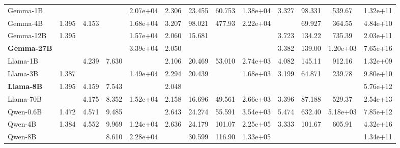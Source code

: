 \begin{tabular}{l|cccc|cccc|cccc}
Gemma-1B & \cellcolor{green2}{1.370} & \cellcolor{green3}{4.043} & \cellcolor{green5}{7.009} & 2.07e+04 & 2.306 & 23.455 & 60.753 & 1.38e+04 & 3.327 & 98.331 & 539.67 & 1.32e+11 \\
Gemma-4B & 1.395 & 4.153 & \cellcolor{green3}{7.298} & 1.68e+04 & 3.207 & 98.021 & 477.93 & 2.22e+04 & \cellcolor{green1}{2.988} & 69.927 & 364.55 & 4.84e+10 \\
Gemma-12B & 1.395 & \cellcolor{green1}{4.084} & \cellcolor{green4}{7.210} & 1.57e+04 & 2.060 & 15.681 & \cellcolor{green2}{37.171} & \cellcolor{green3}{545.83} & 3.723 & 134.22 & 735.39 & 2.03e+11 \\
\textbf{Gemma-27B} & \cellcolor{green4}{1.327} & \cellcolor{green5}{3.803} & \cellcolor{green1}{7.458} & 3.39e+04 & 2.050 & \cellcolor{green4}{13.034} & \cellcolor{green4}{32.353} & \cellcolor{green2}{603.20} & 3.382 & 139.00 & 1.20e+03 & 7.65e+16 \\
\midrule

Llama-1B & \cellcolor{green1}{1.374} & 4.239 & 7.630 & \cellcolor{green2}{6.38e+03} & 2.106 & 20.469 & 53.010 & 2.74e+03 & 4.082 & 145.11 & 912.16 & 1.32e+09 \\
Llama-3B & 1.387 & \cellcolor{green2}{4.061} & \cellcolor{green2}{7.344} & 1.49e+04 & 2.294 & 20.439 & \cellcolor{green1}{44.895} & 1.68e+03 & 3.199 & 64.871 & 239.78 & 9.80e+10 \\
\textbf{Llama-8B} & 1.395 & 4.159 & 7.543 & \cellcolor{green1}{9.03e+03} & 2.048 & \cellcolor{green5}{8.565} & \cellcolor{green5}{17.331} & \cellcolor{green4}{510.50} & \cellcolor{green4}{2.653} & \cellcolor{green2}{43.296} & \cellcolor{green3}{163.16} & 5.76e+12 \\
Llama-70B & \cellcolor{green3}{1.362} & 4.175 & 8.352 & 1.52e+04 & 2.158 & 16.696 & 49.561 & 2.66e+03 & 3.396 & 87.188 & 529.37 & 2.54e+13 \\
\midrule

Qwen-0.6B & 1.472 & 4.571 & 9.485 & \cellcolor{green4}{3.72e+03} & 2.643 & 24.274 & 55.591 & 3.54e+03 & 5.474 & 632.40 & 5.18e+03 & 7.85e+12 \\
Qwen-4B & 1.384 & 4.552 & 9.969 & 1.24e+04 & 2.636 & 24.179 & 101.07 & 2.25e+05 & 3.333 & 101.67 & 605.91 & 4.32e+16 \\
Qwen-8B & \cellcolor{green5}{1.292} & \cellcolor{green4}{4.012} & 8.610 & 2.28e+04 & \cellcolor{green4}{1.753} & 30.599 & 116.90 & 1.33e+05 & \cellcolor{green2}{2.935} & \cellcolor{green1}{48.352} & \cellcolor{green2}{181.43} & 1.34e+11 \\

\bottomrule
\end{tabular}